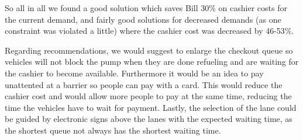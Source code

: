So all in all we found a good solution which saves Bill 30$\%$ on cashier costs for the current demand, and fairly good solutions for decreased demands (as one constraint was violated a little) where the cashier cost was decreased by 46-53$\%$.

Regarding recommendations, we would suggest to enlarge the checkout queue so vehicles will not block the pump when they are done refueling and are waiting for the cashier to become available.
Furthermore it would be an idea to pay unattented at a barrier so people can pay with a card. This would reduce the cashier cost and would allow more people to pay at the same time, reducing the time the vehicles have to wait for payment.
Lastly, the selection of the lane could be guided by electronic signs above the lanes with the expected waiting time, as the shortest queue not always has the shortest waiting time.